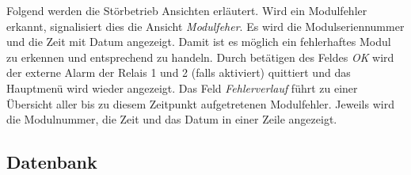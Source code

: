 Folgend werden  die St\"orbetrieb Ansichten erl\"autert. Wird  ein Modulfehler
erkannt,  signalisiert   dies  die  Ansicht  \emph{Modulfeher}. Es   wird  die
Modulseriennummer und die Zeit mit Datum angezeigt. Damit ist es m\"oglich ein
fehlerhaftes Modul zu erkennen  und entsprechend zu handeln. Durch bet\"atigen
des  Feldes  \emph{OK} wird  der  externe  Alarm der  Relais  1  und 2  (falls
aktiviert)  quittiert  und das  Hauptmen\"u  wird  wieder angezeigt. Das  Feld
\emph{Fehlerverlauf}  f\"uhrt  zu  einer   \"Ubersicht  aller  bis  zu  diesem
Zeitpunkt aufgetretenen  Modulfehler. Jeweils wird  die Modulnummer,  die Zeit
und das Datum in einer Zeile angezeigt.


\subsection{Datenbank}
\label{subsec:software:master:database}

